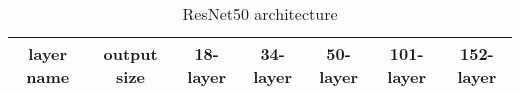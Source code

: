\begin{table*}
\caption{\label{resnet50} ResNet50 architecture}
\begin{tabularx}{\textwidth}{|c|c|c|c|c|c|c|}
\hline
layer name & output size      & \multicolumn{1}{c|}{18-layer}                                                                                                                                                                                                                                                                                                          & \multicolumn{1}{c|}{34-layer}                                                                                                                                                                                                                                                                                                          & \multicolumn{1}{c|}{50-layer}                                                                                                                                                                                                                                                                                                                                                                                & \multicolumn{1}{c|}{101-layer}                                                                                                                                                                                                                                                                                                                                                                               & 152-layer                                                                                                                                                                                                                                                                                                                                                                               \\ \hline

\end{tabularx}
\end{table*}
